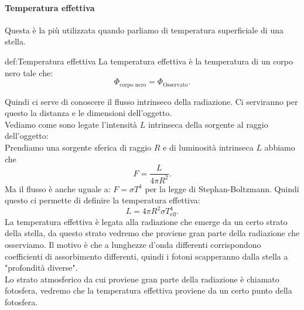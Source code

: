 \paragraph{Temperatura effettiva}
Questa è la più utilizzata quando parliamo di temperatura superficiale di una stella.
\begin{defn}{def:Temperatura effettiva}
	La temperatura effettiva è la temperatura di un corpo nero tale che:
	\[
		\Phi_{\text{corpo nero}} = \Phi_{\text{Osservato}}
	.\] 
\end{defn}
Quindi ci serve di conoscere il flusso intrinseco della radiazione. Ci serviranno per questo la distanza e le dimensioni dell'oggetto.\\
Vediamo come sono legate l'intensità $L$ intrinseca della sorgente al raggio dell'oggetto: \\
Prendiamo una sorgente sferica di raggio $R$ e di luminosità intrinseca $L$ abbiamo che
\[
	F = \frac{L}{4\pi R^2}
.\] 
Ma il flusso è anche uguale a: $F = \sigma T^{4}$ per la legge di Stephan-Boltzmann. Quindi questo ci permette di definire la temperatura effettiva:
\[
	L = 4\pi R^2 \sigma T_{\text{eff}}^{4}
.\] 
La temperatura effettiva è legata alla radiazione che emerge da un certo strato della stella, da questo strato vedremo che proviene gran parte della radiazione che osserviamo. Il motivo è che a lunghezze d'onda differenti corrispondono coefficienti di assorbimento differenti, quindi i fotoni scapperanno dalla stella a "profondità diverse".\\
Lo strato atmosferico da cui proviene gran parte della radiazione è chiamato fotosfera, vedremo che la temperatura effettiva proviene da un certo punto della fotosfera.
